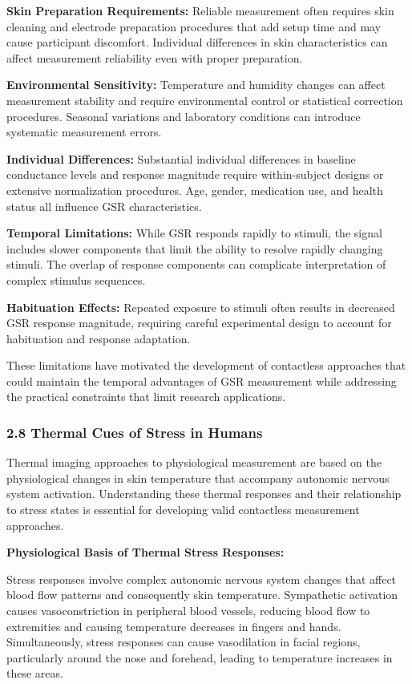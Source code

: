 \documentclass[12pt,a4paper]{report}
\begin{document}
\textbf{Skin Preparation Requirements:} Reliable measurement often requires skin cleaning and electrode preparation
procedures that add setup time and may cause participant discomfort. Individual differences in skin characteristics can
affect measurement reliability even with proper preparation.

\textbf{Environmental Sensitivity:} Temperature and humidity changes can affect measurement stability and require
environmental control or statistical correction procedures. Seasonal variations and laboratory conditions can introduce
systematic measurement errors.

\textbf{Individual Differences:} Substantial individual differences in baseline conductance levels and response magnitude
require within-subject designs or extensive normalization procedures. Age, gender, medication use, and health status all
influence GSR characteristics.

\textbf{Temporal Limitations:} While GSR responds rapidly to stimuli, the signal includes slower components that limit the
ability to resolve rapidly changing stimuli. The overlap of response components can complicate interpretation of complex
stimulus sequences.

\textbf{Habituation Effects:} Repeated exposure to stimuli often results in decreased GSR response magnitude, requiring
careful experimental design to account for habituation and response adaptation.

These limitations have motivated the development of contactless approaches that could maintain the temporal advantages
of GSR measurement while addressing the practical constraints that limit research applications.

\subsubsection{2.8 Thermal Cues of Stress in Humans}

Thermal imaging approaches to physiological measurement are based on the physiological changes in skin temperature that
accompany autonomic nervous system activation. Understanding these thermal responses and their relationship to stress
states is essential for developing valid contactless measurement approaches.

\textbf{Physiological Basis of Thermal Stress Responses:}

Stress responses involve complex autonomic nervous system changes that affect blood flow patterns and consequently skin
temperature. Sympathetic activation causes vasoconstriction in peripheral blood vessels, reducing blood flow to
extremities and causing temperature decreases in fingers and hands. Simultaneously, stress responses can cause
vasodilation in facial regions, particularly around the nose and forehead, leading to temperature increases in these
areas.
\end{document}
